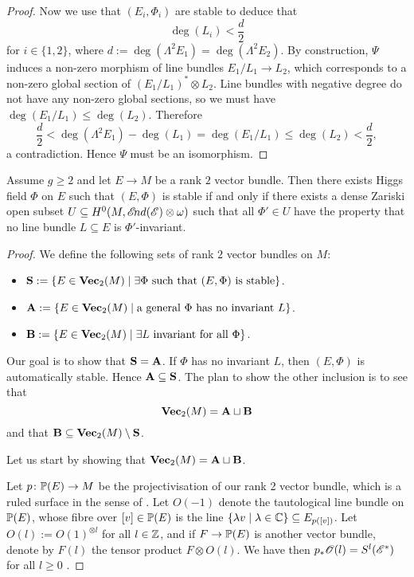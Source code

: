 \documentclass[A4paper, 12pt, british, reqno]{amsart}
\newcommand{\ot}{\otimes}
\newcommand{\dual}{^{*}}
\begin{document}
\begin{prop}
\begin{proof}
	Now we use that $(E_{i},\Phi_{i})$ are stable to deduce that
	\[ \deg(L_{i})<\frac{d}{2} \]
	for $i\in \{1,2\}$, where $d:=\deg(\Lambda^{2}E_{1})=\deg(\Lambda^{2}E_{2})$.
	By construction, $\Psi$ induces a non-zero morphism of line bundles $E_{1}/L_{1}\to L_{2}$, which corresponds to a non-zero global section of $(E_{1}/L_{1})\dual\ot L_{2}$.
	Line bundles with negative degree do not have any non-zero global sections, so we must have $\deg(E_{1}/L_{1})\leqslant \deg(L_{2})$.
	Therefore
	\[ \frac{d}{2}<\deg(\Lambda^{2}E_{1})-\deg(L_{1})=\deg(E_{1}/L_{1})\leqslant \deg(L_{2})<\frac{d}{2}, \]
	a contradiction.
	Hence $\Psi$ must be an isomorphism.
    \end{proof}
\end{prop}

\begin{prop}
    Assume $g\geqslant 2$ and let $E\to M$ be a rank $2$ vector bundle.
    Then there exists Higgs field $\Phi$ on $E$ such that $(E,\Phi)$ is stable if and only if there exists a dense Zariski open subset $U\subseteq H^{0}(M,\sEnd(\E)\ot \w)$ such that all $\Phi'\in U$ have the property that no line bundle $L\subseteq E$ is $\Phi'$-invariant.
    \begin{proof}
	We define the following sets of rank $2$ vector bundles on $M$:
	\begin{itemize}
	    \item $\bfS:=\{ E\in \Vec_{2}(M)\mid \exists \Phi \text{ such that }(E,\Phi)\text{ is stable}\}$.
	    \item $\bfA:=\{ E\in \Vec_{2}(M)\mid \text{a general }\Phi\text{ has no invariant }L \}$.
	    \item $\bfB:=\{ E\in \Vec_{2}(M)\mid \exists L\text{ invariant for all }\Phi\}$.
	\end{itemize}

	Our goal is to show that $\bfS=\bfA$.
	If $\Phi$ has no invariant $L$, then $(E,\Phi)$ is automatically stable.
	Hence $\bfA\subseteq \bfS$.
	The plan to show the other inclusion is to see that
	\[ \Vec_{2}(M)=\bfA\sqcup \bfB \]
	and that $\bfB\subseteq \Vec_{2}(M)\setminus \bfS$.
	
	Let us start by showing that $\Vec_{2}(M)=\bfA\sqcup \bfB$.

	Let $p\colon \P(E)\to M$ be the projectivisation of our rank 2 vector bundle, which is a ruled surface in the sense of \cite[\S V.2]{har77}.
	Let $O(-1)$ denote the tautological line bundle on $\P(E)$, whose fibre over $[v]\in \P(E)$ is the line $\{\lambda v \mid \lambda\in \C\}\subseteq E_{p([v])}$.
	Let $O(l):=O(1)^{\ot l}$ for all $l\in \Z$, and if $F\to \P(E)$ is another vector bundle, denote by $F(l)$ the tensor product $F\ot O(l)$.
	We have then $p_{*}\O(l)=S^{l}(\E\dual)$ for all $l\geqslant 0$ \cite[Exercise III.8.4]{har77}.


\end{proof}
\end{prop}
\end{document}
